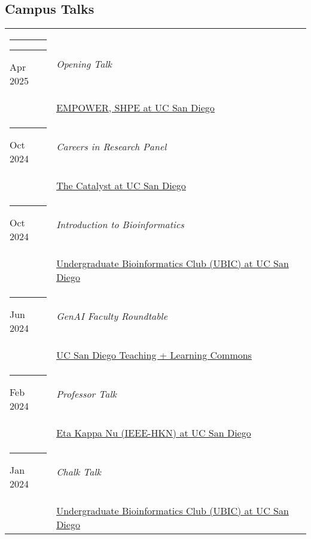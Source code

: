 \documentclass[margin,line]{res}
\begin{document}
\begin{resume}
\section{\sc Campus Talks}
\begin{longtable}{@{}p{0.7in}p{4in}}\rule{-1mm}{4.5mm}
\hspace*{-4mm} \rule{-1mm}{5mm} Apr 2025 & \textit{Opening Talk}\\*
\hspace*{-4mm} & \hspace{4mm} \href{https://sites.google.com/view/shpeucsd}{EMPOWER, SHPE at UC San Diego}\\
\hspace*{-4mm} \rule{-1mm}{5mm} Oct 2024 & \textit{Careers in Research Panel}\\*
\hspace*{-4mm} & \hspace{4mm} \href{https://escholarship.org/uc/ucsd_aep_catalyst}{The Catalyst at UC San Diego}\\
\hspace*{-4mm} \rule{-1mm}{5mm} Oct 2024 & \textit{Introduction to Bioinformatics}\\*
\hspace*{-4mm} & \hspace{4mm} \href{https://ubicucsd.github.io/}{Undergraduate Bioinformatics Club (UBIC) at UC San Diego}\\
\hspace*{-4mm} \rule{-1mm}{5mm} Jun 2024 & \textit{GenAI Faculty Roundtable}\\*
\hspace*{-4mm} & \hspace{4mm} \href{https://commons.ucsd.edu/}{UC San Diego Teaching + Learning Commons}\\
\hspace*{-4mm} \rule{-1mm}{5mm} Feb 2024 & \textit{Professor Talk}\\*
\hspace*{-4mm} & \hspace{4mm} \href{https://hkn.ucsd.edu/}{Eta Kappa Nu (IEEE-HKN) at UC San Diego}\\
\hspace*{-4mm} \rule{-1mm}{5mm} Jan 2024 & \textit{Chalk Talk}\\*
\hspace*{-4mm} & \hspace{4mm} \href{http://ubicucsd.github.io/}{Undergraduate Bioinformatics Club (UBIC) at UC San Diego}\\

\end{longtable}
\end{resume}
\end{document}
